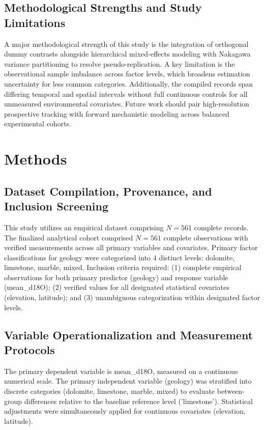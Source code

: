 \documentclass[sn-basic,Numbered]{sn-jnl}%
\begin{document}
\subsection{Methodological Strengths and Study Limitations}
A major methodological strength of this study is the integration of orthogonal dummy contrasts alongside hierarchical mixed-effects modeling with Nakagawa variance partitioning to resolve pseudo-replication. A key limitation is the observational sample imbalance across factor levels, which broadens estimation uncertainty for less common categories. Additionally, the compiled records span differing temporal and spatial intervals without full continuous controls for all unmeasured environmental covariates. Future work should pair high-resolution prospective tracking with forward mechanistic modeling across balanced experimental cohorts.

\section{Methods}
\label{sec:methods}
\subsection{Dataset Compilation, Provenance, and Inclusion Screening}
This study utilizes an empirical dataset comprising $N = 561$ complete records. The finalized analytical cohort comprised $N = 561$ complete observations with verified measurements across all primary variables and covariates. Primary factor classifications for geology were categorized into 4 distinct levels: dolomite, limestone, marble, mixed. Inclusion criteria required: (1) complete empirical observations for both primary predictor (geology) and response variable (mean\_d18O); (2) verified values for all designated statistical covariates (elevation, latitude); and (3) unambiguous categorization within designated factor levels.

\subsection{Variable Operationalization and Measurement Protocols}
The primary dependent variable is mean\_d18O, measured on a continuous numerical scale. The primary independent variable (geology) was stratified into discrete categories (dolomite, limestone, marble, mixed) to evaluate between-group differences relative to the baseline reference level ('limestone'). Statistical adjustments were simultaneously applied for continuous covariates (elevation, latitude).
\end{document}
